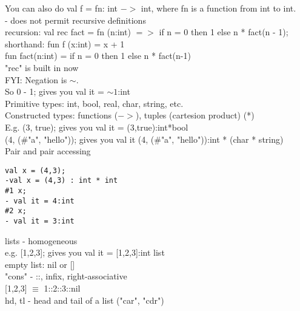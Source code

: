 \documentclass[11pt]{article}
\begin{document}
You can also do val f = fn: int $->$ int, where fn is a function from int to int. \\

- does not permit recursive definitions \\

recursion: val rec fact = fn (n:int) $=>$ if n = 0 then 1 else n * fact(n - 1); \\

shorthand: fun f (x:int) = x + 1 \\

fun fact(n:int) = if n = 0 then 1 else n * fact(n-1) \\

"rec" is built in now \\

FYI: Negation is $\sim$. \\

So 0 - 1; gives you val it = $\sim 1$:int \\

Primitive types: int, bool, real, char, string, etc. \\

Constructed types: functions ($->$), tuples (cartesion product) (*) \\

E.g. (3, true); gives you val it = (3,true):int*bool \\

(4, ($\#$"a", "hello")); gives you val it (4, ($\#$"a", "hello")):int * (char * string) \\

Pair and pair accessing
\begin{verbatim}
val x = (4,3);
-val x = (4,3) : int * int
#1 x;
- val it = 4:int
#2 x;
- val it = 3:int
\end{verbatim}

lists - homogeneous \\

e.g. [1,2,3]; gives you val it = [1,2,3]:int list \\

empty list: nil or [] \\

"cons" - ::, infix, right-associative\\

[1,2,3] $\equiv$ 1::2::3::nil \\

hd, tl - head and tail of a list ("car", "cdr") \\
\end{document}

